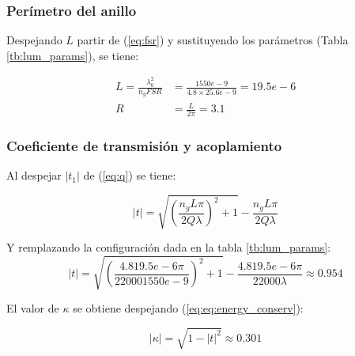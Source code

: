 \subsubsection{Perímetro del anillo}

Despejando $L$ partir de (\ref{eq:fsr}) y sustituyendo los parámetros 
(Tabla \ref{tb:lum_params}), se tiene:

\begin{align*}
L=\frac{\lambda_0^2}{n_g FSR} 
&=\frac{1550e-9}{4.8 \times 25.6e-9}
 =19.5e-6  \\ %
R &= \frac{L}{2 \pi} = 3.1 %
\end{align*}

\subsubsection{Coeficiente de transmisión y acoplamiento} 

Al despejar $|t_1|$ de (\ref{eq:q}) se tiene:

\begin{equation}
|t|=\sqrt{ \left( \frac{n_g L \pi}{2 Q \lambda} \right) ^2 + 1} - 
    \frac{n_g L \pi}{2 Q \lambda}
\label{eq:t}
\end{equation} 

Y remplazando la configuración dada en la tabla \ref{tb:lum_params}:
\begin{equation*}
|t|=\sqrt{ \left( \frac{4.8 19.5e-6 \pi}{2 2000 1550e-9} \right) ^2 + 1} - 
    \frac{4.8 19.5e-6 \pi}{2 2000 \lambda}
   \approx 0.954
\label{eq:lum_t}
\end{equation*}

El valor de $\kappa$ se obtiene despejando (\ref{eq:eq:energy_conserv}):

\begin{equation}
|\kappa|=\sqrt{1 - |t|^2} \approx 0.301
\label{eq:lum_k}
\end{equation} 


